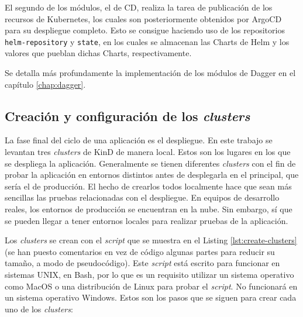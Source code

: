 El segundo de los módulos, el de CD, realiza la tarea de publicación de los recursos de Kubernetes, los cuales son posteriormente obtenidos por ArgoCD para su despliegue completo. Esto se consigue haciendo uso de los repositorios \texttt{helm-repository} y \texttt{state}, en los cuales se almacenan las Charts de Helm y los valores que pueblan dichas Charts, respectivamente.

Se detalla más profundamente la implementación de los módulos de Dagger en el capítulo \ref{chap:dagger}.

\subsection*{Creación y configuración de los \textit{clusters}}
\label{subsec:clusters}

La fase final del ciclo de una aplicación es el despliegue. En este trabajo se levantan tres \textit{clusters} de KinD de manera local. Estos son los lugares en los que se despliega la aplicación. Generalmente se tienen diferentes \textit{clusters} con el fin de probar la aplicación en entornos distintos antes de desplegarla en el principal, que sería el de producción. El hecho de crearlos todos localmente hace que sean más sencillas las pruebas relacionadas con el despliegue. En equipos de desarrollo reales, los entornos de producción se encuentran en la nube. Sin embargo, sí que se pueden llegar a tener entornos locales para realizar pruebas de la aplicación.

Los \textit{clusters} se crean con el \textit{script} que se muestra en el Listing \ref{lst:create-clusters} (se han puesto comentarios en vez de código algunas partes para reducir su tamaño, a modo de pseudocódigo). Este \textit{script} está escrito para funcionar en sistemas UNIX, en Bash, por lo que es un requisito utilizar un sistema operativo como MacOS o una distribución de Linux para probar el \textit{script}. No funcionará en un sistema operativo Windows. Estos son los pasos que se siguen para crear cada uno de los \textit{clusters}:

